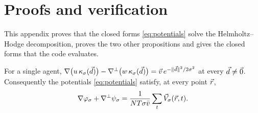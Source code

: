\section{Proofs and verification}
\label{app:proofs}

This appendix proves that the closed forms \eqref{eq:potentials} solve the Helmholtz--Hodge decomposition, proves the
two other propositions and gives the closed forms that the code evaluates.

\begin{proposition}\label{prop:hhd}
For a single agent, $\nabla\big(u\,\kappa_\sigma(\vec{d})\big)-\nabla^{\perp}\big(w\,\kappa_\sigma(\vec{d})\big)
=\vec{v}\,e^{-\|\vec{d}\|^2/2\sigma^2}$ at every $\vec{d}\neq\vec 0$. Consequently the potentials \eqref{eq:potentials} satisfy,
at every point $\vec{r}$,
\[
\nabla\varphi_\sigma+\nabla^{\perp}\psi_\sigma=\frac{1}{NT\sigma\bar v}\sum_{t}\vec{V}_\sigma(\vec{r},t).
\]
\end{proposition}

